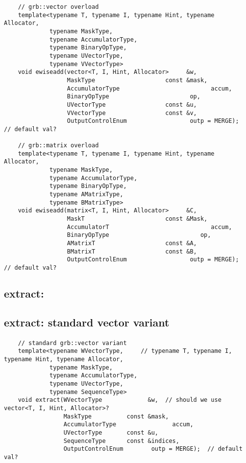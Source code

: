 \begin{verbatim}
    // grb::vector overload
    template<typename T, typename I, typename Hint, typename Allocator,
             typename MaskType,
             typename AccumulatorType,
             typename BinaryOpType,
             typename UVectorType,
             typename VVectorType>
    void ewiseadd(vector<T, I, Hint, Allocator>     &w,
                  MaskType                    const &mask,
                  AccumulatorType                          accum,
                  BinaryOpType                       op,
                  UVectorType                 const &u,
                  VVectorType                 const &v,
                  OutputControlEnum                  outp = MERGE);  // default val?

    // grb::matrix overload
    template<typename T, typename I, typename Hint, typename Allocator,
             typename MaskType,
             typename AccumulatorType,
             typename BinaryOpType,
             typename AMatrixType,
             typename BMatrixType>
    void ewiseadd(matrix<T, I, Hint, Allocator>     &C,
                  MaskT                       const &Mask,
                  AccumulatorT                             accum,
                  BinaryOpType                          op,
                  AMatrixT                    const &A,
                  BMatrixT                    const &B,
                  OutputControlEnum                  outp = MERGE);  // default val?
\end{verbatim}


\subsection{{\sf extract}: }

\subsection{{\sf extract}: standard vector variant}

\paragraph{\syntax}

\begin{verbatim}
    // standard grb::vector variant
    template<typename WVectorType,     // typename T, typename I, typename Hint, typename Allocator,
             typename MaskType,
             typename AccumulatorType,
             typename UVectorType,
             typename SequenceType>
    void extract(WVectorType             &w,  // should we use vector<T, I, Hint, Allocator>?
                 MaskType          const &mask,
                 AccumulatorType                accum,
                 UVectorType       const &u,
                 SequenceType      const &indices,
                 OutputControlEnum        outp = MERGE);  // default val?
\end{verbatim}

